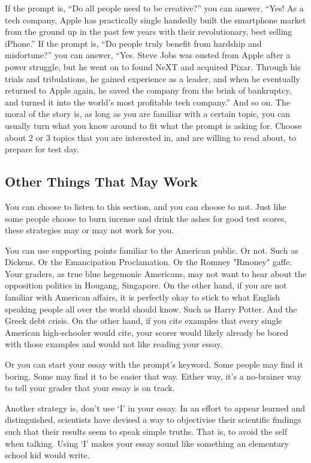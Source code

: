 If the prompt is, “Do all people need to be creative?” you can answer, “Yes! As a tech company, Apple has practically single handedly built the smartphone market from the ground up in the past few years with their revolutionary, best selling iPhone.” If the prompt is, “Do people truly benefit from hardship and misfortune?” you can answer, “Yes. Steve Jobs was ousted from Apple after a power struggle, but he went on to found NeXT and acquired Pixar. Through his trials and tribulations, he gained experience as a leader, and when he eventually returned to Apple again, he saved the company from the brink of bankruptcy, and turned it into the world's most profitable tech company.” And so on. The moral of the story is, as long as you are familiar with a certain topic, you can usually turn what you know around to fit what the prompt is asking for. Choose about 2 or 3 topics that you are interested in, and are willing to read about, to prepare for test day.
\subsection{Other Things That May Work}
You can choose to listen to this section, and you can choose to not. Just like some people choose to burn incense and drink the ashes for good test scores, these strategies may or may not work for you.

You can use supporting points familiar to the American public. Or not. Such as Dickens. Or the Emancipation Proclamation. Or the Romney "Rmoney" gaffe. Your graders, as true blue hegemonic Americans, may not want to hear about the opposition politics in Hougang, Singapore. On the other hand, if you are not familiar with American affairs, it is perfectly okay to stick to what English speaking people all over the world should know. Such as Harry Potter. And the Greek debt crisis. On the other hand, if you cite examples that every single American high-schooler would cite, your scorer would likely already be bored with those examples and would not like reading your essay.

Or you can start your essay with the prompt's keyword. Some people may find it boring. Some may find it to be easier that way. Either way, it's a no-brainer way to tell your grader that your essay is on track.

Another strategy is, don't use ‘I' in your essay. In an effort to appear learned and distinguished, scientists have devised a way to objectivise their scientific findings such that their results seem to speak simple truths. That is, to avoid the self when talking. Using ‘I' makes your essay sound like something an elementary school kid would write. 

